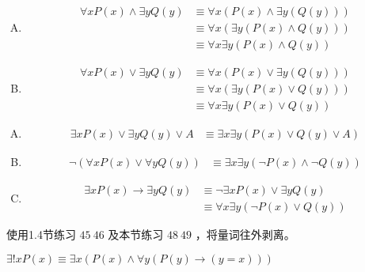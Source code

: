 {{        %
        \begin{practices}
            \begin{enumerate}[A.]
                \item
                {
                    \begin{align*}
                        \forall x P(x) \wedge \exists y Q(y)
                        &\equiv \forall x (P(x) \wedge \exists y (Q(y))) \\
                        &\equiv \forall x (\exists y (P(x) \wedge Q(y))) \\
                        &\equiv \forall x \exists y (P(x) \wedge Q(y))
                    \end{align*}
                }
                \item
                {
                    \begin{align*}
                        \forall x P(x) \vee \exists y Q(y)
                        &\equiv \forall x (P(x) \vee \exists y (Q(y))) \\
                        &\equiv \forall x (\exists y (P(x) \vee Q(y))) \\
                        &\equiv \forall x \exists y (P(x) \vee Q(y))
                    \end{align*}
                }
            \end{enumerate}
        \end{practices}

        \begin{practices}
            \begin{enumerate}[A.]
                \item
                {
                    \begin{align*}
                        \exists x P(x) \vee \exists y Q(y) \vee A
                        &\equiv \exists x \exists y (P(x) \vee Q(y) \vee A)
                    \end{align*}
                }
                \item
                {
                    \begin{align*}
                        \neg (\forall x P(x) \vee \forall y Q(y))
                        &\equiv \exists x \exists y (\neg P(x) \wedge \neg Q(y))
                    \end{align*}
                }
                \item
                {
                    \begin{align*}
                        \exists x P(x) \rightarrow \exists y Q(y)
                        &\equiv \neg \exists x P(x) \vee \exists y Q(y) \\
                        &\equiv \forall x \exists y (\neg P(x) \vee Q(y))
                    \end{align*}
                }
            \end{enumerate}
        \end{practices}

        \begin{practices}
            使用1.4节练习 $45~46$ 及本节练习 $48~49$ ，将量词往外剥离。
        \end{practices}

        \begin{practices}
            $\exists !x P(x) \equiv \exists x (P(x) \wedge \forall y (P(y) \rightarrow (y = x)))$
        \end{practices}
    }
}
